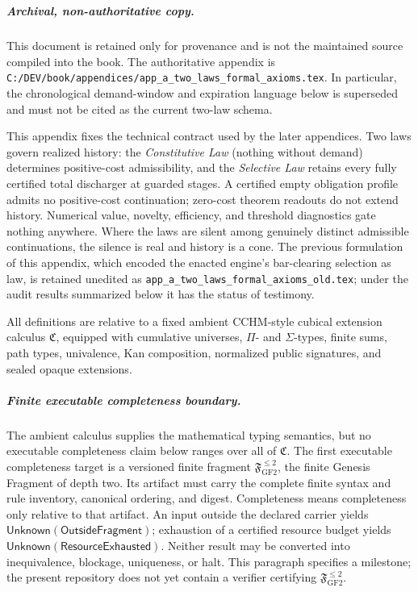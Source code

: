 \chapter[Formal Two-Law Schema]{}\label{app:two-laws}

\paragraph{Archival, non-authoritative copy.}
This document is retained only for provenance and is not the maintained source
compiled into the book. The authoritative appendix is
\texttt{C:/DEV/book/appendices/app\_a\_two\_laws\_formal\_axioms.tex}.
In particular, the chronological demand-window and expiration language below
is superseded and must not be cited as the current two-law schema.

This appendix fixes the technical contract used by the later appendices.
Two laws govern realized history: the \emph{Constitutive Law} (nothing without
demand) determines positive-cost admissibility, and the \emph{Selective Law}
retains every fully certified total discharger at guarded stages. A certified
empty obligation profile admits no positive-cost continuation; zero-cost
theorem readouts do not extend history. Numerical value, novelty, efficiency,
and threshold diagnostics gate nothing anywhere. Where the laws are silent
among genuinely distinct admissible continuations, the silence is real and
history is a cone.
The previous formulation of this appendix, which encoded the enacted engine's
bar-clearing selection as law, is retained unedited as
\texttt{app\_a\_two\_laws\_formal\_axioms\_old.tex}; under the audit results
summarized below it has the status of testimony.

All definitions are relative to a fixed ambient CCHM-style cubical extension
calculus \(\mathfrak{C}\), equipped with cumulative universes, \(\Pi\)- and
\(\Sigma\)-types, finite sums, path types, univalence, Kan composition,
normalized public signatures, and sealed opaque extensions.

\paragraph{Finite executable completeness boundary.}
The ambient calculus supplies the mathematical typing semantics, but no
executable completeness claim below ranges over all of
\(\mathfrak C\). The first executable completeness target is a versioned finite fragment
\(\mathfrak F_{\mathrm{GF2}}^{\le2}\), the finite Genesis Fragment of
depth two. Its artifact must carry the complete finite syntax and rule
inventory, canonical ordering, and digest. Completeness means completeness
only relative to that artifact. An input outside the declared carrier yields
\(\mathsf{Unknown}(\mathsf{OutsideFragment})\); exhaustion of a certified
resource budget yields
\(\mathsf{Unknown}(\mathsf{ResourceExhausted})\). Neither result may be
converted into inequivalence, blockage, uniqueness, or halt. This paragraph
specifies a milestone; the present repository does not yet contain a
verifier certifying \(\mathfrak F_{\mathrm{GF2}}^{\le2}\).

